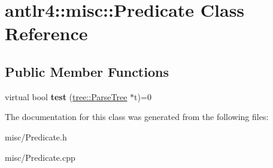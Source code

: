 \hypertarget{classantlr4_1_1misc_1_1Predicate}{}\section{antlr4\+:\+:misc\+:\+:Predicate Class Reference}
\label{classantlr4_1_1misc_1_1Predicate}
\subsection*{Public Member Functions}
\begin{DoxyCompactItemize}
\item 
\mbox{\label{classantlr4_1_1misc_1_1Predicate_a4ad98e043f540b9ebdb4ab5857501aa5}} 
virtual bool {\bfseries test} (\hyperlink{classantlr4_1_1tree_1_1ParseTree}{tree\+::\+Parse\+Tree} $\ast$t)=0
\end{DoxyCompactItemize}


The documentation for this class was generated from the following files\+:\begin{DoxyCompactItemize}
\item 
misc/Predicate.\+h\item 
misc/Predicate.\+cpp\end{DoxyCompactItemize}
